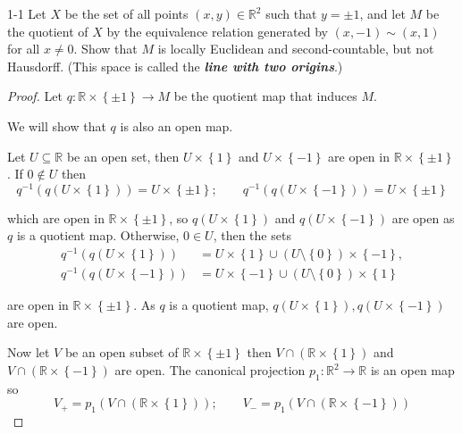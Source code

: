 \begin{problem}{1-1}
    Let \( X \) be the set of all points \( (x, y) \in \mathbb{R}^{2} \) such that \( y = \pm 1 \), and let \( M \) be the quotient of \( X \) by the equivalence relation generated by \( (x, -1) \sim (x, 1) \) for all \( x \ne 0 \). Show that \( M \) is locally Euclidean and second-countable, but not Hausdorff. (This space is called the \textbf{\emph{line with two origins}}.)
\end{problem}

\begin{proof}
    Let \( q: \mathbb{R} \times \left\{ \pm 1 \right\} \to M \) be the quotient map that induces \( M \).

    We will show that \( q \) is also an open map.

    Let \( U \subseteq \mathbb{R} \) be an open set, then \( U \times \left\{ 1 \right\} \) and \( U \times \left\{ -1 \right\} \) are open in \( \mathbb{R} \times \left\{ \pm 1 \right\} \). If \( 0 \notin U \) then
    \[
        q^{-1}(q(U \times \left\{ 1 \right\})) = U \times \left\{ \pm 1 \right\}; \qquad q^{-1}(q(U \times \left\{ -1 \right\})) = U \times \left\{ \pm 1 \right\}
    \]

    which are open in \( \mathbb{R} \times \left\{ \pm 1 \right\} \), so \( q(U \times \left\{ 1 \right\}) \) and \( q(U \times \left\{ -1 \right\}) \) are open as \( q \) is a quotient map. Otherwise, \( 0 \in U \), then the sets
    \begingroup
    \allowdisplaybreaks%
    \begin{align*}
        q^{-1}(q(U \times \left\{ 1 \right\}))  & = U \times \left\{ 1 \right\} \cup (U \setminus \left\{ 0 \right\}) \times \left\{ -1 \right\}, \\
        q^{-1}(q(U \times \left\{ -1 \right\})) & = U \times \left\{ -1 \right\} \cup (U \setminus \left\{ 0 \right\}) \times \left\{ 1 \right\}
    \end{align*}
    \endgroup

    are open in \( \mathbb{R} \times \left\{ \pm 1 \right\} \). As \( q \) is a quotient map, \( q(U \times \left\{ 1 \right\}), q(U \times \left\{ -1 \right\}) \) are open.

    Now let \( V \) be an open subset of \( \mathbb{R} \times \left\{ \pm 1 \right\} \) then \( V \cap (\mathbb{R} \times \left\{ 1 \right\}) \) and \( V \cap (\mathbb{R} \times \left\{ -1 \right\}) \) are open. The canonical projection \( p_{1}: \mathbb{R}^{2} \to \mathbb{R} \) is an open map so
    \[
        V_{+} = p_{1}(V \cap (\mathbb{R} \times \left\{ 1 \right\})); \qquad V_{-} = p_{1}(V \cap (\mathbb{R} \times \left\{ -1 \right\}))
    \]


\end{proof}
